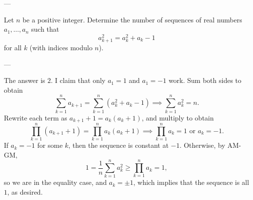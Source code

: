 
---

Let $n$ be a positive integer. Determine the number of sequences of real numbers $a_1,\ldots,a_n$ such that \[a_{k+1}^2=a_k^2+a_k-1\]
for all $k$ (with indices modulo $n$).

---

The answer is $\boxed2$. I claim that only $a_1=1$ and $a_1=-1$ work. Sum both sides to obtain \[\sum_{k=1}^na_{k+1}=\sum_{k=1}^n \left(a_k^2+a_k-1\right)\implies\sum_{k=1}^na_k^2=n.\]
Rewrite each term as $a_{k+1}+1=a_k(a_k+1)$, and multiply to obtain \[\prod_{k=1}^n (a_{k+1}+1)=\prod_{k=1}^na_k(a_k+1)\implies \prod_{k=1}^na_k=1\text{ or }a_k=-1.\]
If $a_k=-1$ for some $k$, then the sequence is constant at $-1$. Otherwise, by AM-GM, \[1=\frac1n\sum_{k=1}^na_k^2\ge\prod_{k=1}^na_k=1,\]
so we are in the equality case, and $a_k=\pm 1$, which implies that the sequence is all $1$, as desired.
